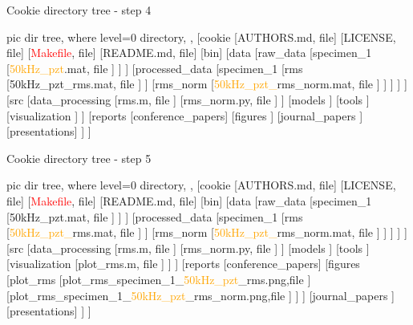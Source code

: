 \documentclass[10pt,aspectratio=169]{beamer} %
\begin{document}
\begin{frame}[t]{Cookie directory tree - step 4}
\centering
	\begin{forest}
		pic dir tree,
		where level=0{}{%
			directory,
		},
		[cookie
		[AUTHORS.md, file]
		[LICENSE, file]
		[\textcolor{red}{Makefile}, file]
		[README.md, file]
		[bin]
		[data
		[raw\_data
			[specimen\_1
				[\textcolor{orange}{50kHz\_pzt}.mat, file
				]
			]
		]
		[processed\_data
			[specimen\_1
				[rms
					[50kHz\_pzt\_rms.mat, file
					]
				]
				[\alert{rms\_norm}
					[\textcolor{orange}{50kHz\_pzt\_}\alert{rms\_norm}.mat, file
					]
				]
			]
		]
		]
		[src
			[data\_processing
				[rms.m, file
				]
				[\alert{rms\_norm}.py, file
				]
			]
			[models
			]
			[tools
			]
			[visualization
			]
		]
		[reports
			[conference\_papers]	
			[figures
			]
			[journal\_papers
			]
			[presentations]
		]
		]
	\end{forest}
\end{frame}
\begin{frame}[t]{Cookie directory tree - step 5}
\centering
	\begin{forest}
		pic dir tree,
		where level=0{}{%
			directory,
		},
		[cookie
		[AUTHORS.md, file]
		[LICENSE, file]
		[\textcolor{red}{Makefile}, file]
		[README.md, file]
		[bin]
		[data
		[raw\_data
			[specimen\_1
				[50kHz\_pzt.mat, file
				]
			]
		]
		[processed\_data
			[specimen\_1
				[rms
					[\textcolor{orange}{50kHz\_pzt\_}\alert{rms}.mat, file
					]
				]
				[rms\_norm
					[\textcolor{orange}{50kHz\_pzt\_}\alert{rms\_norm}.mat, file
					]
				]
			]
		]
		]
		[src
			[data\_processing
				[rms.m, file
				]
				[rms\_norm.py, file
				]
			]
			[models
			]
			[tools
			]
			[visualization
				[\textcolor{logoblue}{plot\_rms}.m, file
				]
			]
		]
		[reports
			[conference\_papers]	
			[figures
				[\textcolor{logoblue}{plot\_rms}
					[\textcolor{logoblue}{plot\_rms}\_specimen\_1\_\textcolor{orange}{50kHz\_pzt}\_\alert{rms}.png,file
					]
					[\textcolor{logoblue}{plot\_rms}\_specimen\_1\_\textcolor{orange}{50kHz\_pzt}\_\alert{rms\_norm}.png,file
					]
				]
			]
			[journal\_papers
			]
			[presentations]
		]
		]
	\end{forest}
\end{frame}
\end{document}
